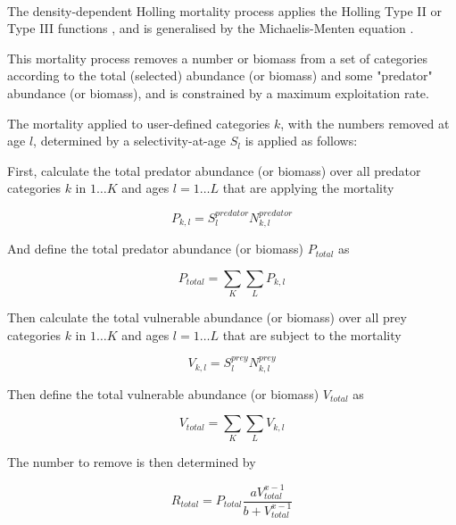 \paragraph{}\label{sec:Process-MortalityHollingRate} 

The density-dependent Holling mortality process applies the Holling Type II or Type III functions \citep{Holling1959}, and is generalised by the Michaelis-Menten equation \citep{MentenMichaelis1913}.

This mortality process removes a number or biomass from a set of categories according to the total (selected) abundance (or biomass) and some "predator" abundance (or biomass), and is constrained by a maximum exploitation rate.

The mortality applied to user-defined categories $k$, with the numbers removed at age $l$, determined by a selectivity-at-age $S_l$ is applied as follows:

First, calculate the total predator abundance (or biomass) over all predator categories $k$ in $1 \ldots K$ and ages $l = 1 \ldots L$ that are applying the mortality

\begin{equation}
	P_{k,l} = S^{predator}_l N^{predator}_{k,l}
\end{equation}

And define the total predator abundance (or biomass) $P_{total}$ as

\begin{equation}
	P_{total}  = \sum\limits_K {\sum\limits_L {P_{k,l}}}
\end{equation}

Then calculate the total vulnerable abundance (or biomass) over all prey categories $k$ in $1 \ldots K$ and ages $l = 1 \ldots L$ that are subject to the mortality

\begin{equation}
	V_{k,l} = S^{prey}_l N^{prey}_{k,l}
\end{equation}

Then define the total vulnerable abundance (or biomass) $V_{total}$ as

\begin{equation}
	V_{total}  = \sum\limits_K {\sum\limits_L {V_{k,l}}}
\end{equation}

The number to remove is then determined by

\begin{equation}
	R_{total} = P_{total} \frac{a  V_{total}^{x-1}}{b + V_{total}^{x-1}}
\end{equation}

